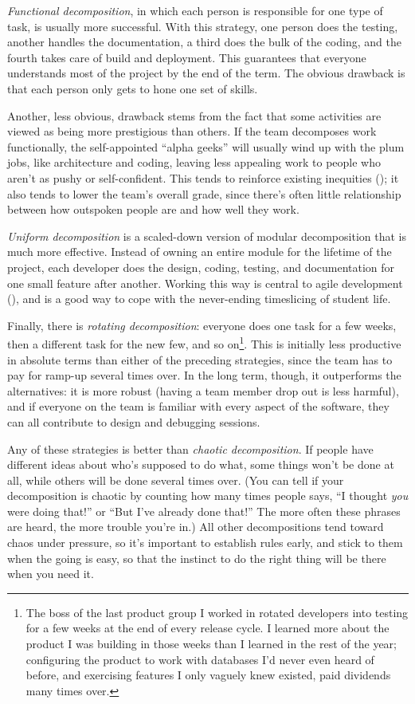 \documentclass{report}
\begin{document}
\emph{Functional decomposition}, in which each person is responsible
for one type of task, is usually more successful.  With this strategy,
one person does the testing, another handles the documentation, a
third does the bulk of the coding, and the fourth takes care of build
and deployment.  This guarantees that everyone understands most of the
project by the end of the term.  The obvious drawback is that each
person only gets to hone one set of skills.

Another, less obvious, drawback stems from the fact that some
activities are viewed as being more prestigious than others.  If the
team decomposes work functionally, the self-appointed ``alpha geeks''
will usually wind up with the plum jobs, like architecture and coding,
leaving less appealing work to people who aren't as pushy or
self-confident.  This tends to reinforce existing inequities
(); it also tends to lower the team's overall
grade, since there's often little relationship between how outspoken
people are and how well they work.

\emph{Uniform decomposition} is a scaled-down version of modular
decomposition that is much more effective.  Instead of owning an
entire module for the lifetime of the project, each developer does the
design, coding, testing, and documentation for one small feature after
another.  Working this way is central to agile development
(), and is a good way to cope with the
never-ending timeslicing of student life.

Finally, there is \emph{rotating decomposition}: everyone does one
task for a few weeks, then a different task for the new few, and so
on\footnote{The boss of the last product group I worked in rotated
developers into testing for a few weeks at the end of every release
cycle.  I learned more about the product I was building in those weeks
than I learned in the rest of the year; configuring the product to
work with databases I'd never even heard of before, and exercising
features I only vaguely knew existed, paid dividends many times
over.}.  This is initially less productive in absolute terms than
either of the preceding strategies, since the team has to pay for
ramp-up several times over.  In the long term, though, it outperforms
the alternatives: it is more robust (having a team member drop out is
less harmful), and if everyone on the team is familiar with every
aspect of the software, they can all contribute to design and
debugging sessions.

Any of these strategies is better than \emph{chaotic decomposition}.
If people have different ideas about who's supposed to do what, some
things won't be done at all, while others will be done several times
over.  (You can tell if your decomposition is chaotic by counting how
many times people says, ``I thought \emph{you} were doing that!''  or
``But I've already done that!''  The more often these phrases are
heard, the more trouble you're in.)  All other decompositions tend
toward chaos under pressure, so it's important to establish rules
early, and stick to them when the going is easy, so that the instinct
to do the right thing will be there when you need it.
\end{document}
